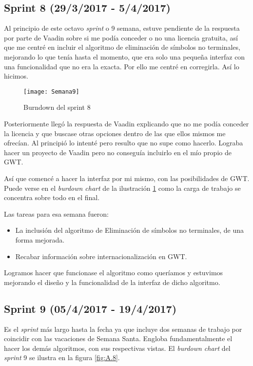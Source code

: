 \subsection{Sprint 8 (29/3/2017 - 5/4/2017)}

Al principio de este octavo \emph{sprint} o 9 semana, estuve pendiente de la respuesta por parte de Vaadin sobre si me podía conceder o no una licencia gratuita, así que me centré en incluir el algoritmo de eliminación de símbolos no terminales, mejorando lo que tenía hasta el momento, que era solo una pequeña interfaz con una funcionalidad que no era la exacta. Por ello me centré en corregirla. Así lo hicimos.

\begin{figure}[h]
\centering
\texttt{[image: Semana9]}
\caption{Burndown del sprint 8}
\label{fig:A.7}
\end{figure}

Posteriormente llegó la respuesta de Vaadin explicando que no me podía conceder la licencia y que buscase otras opciones dentro de las que ellos mismos me ofrecían. Al principió lo intenté pero resulto que no supe como hacerlo. Lograba hacer un proyecto de Vaadin pero no conseguía incluirlo en el mío propio de GWT.

Así que comencé a hacer la interfaz por mi mismo, con las posibilidades de GWT. Puede verse en el \emph{burdown chart }de la ilustración \ref{fig:A.7} como la carga de trabajo se concentra sobre todo en el final.

Las tareas para esa semana fueron: 

\begin{itemize}
\item La inclusión del algoritmo de Eliminación de símbolos no terminales, de una forma mejorada.
\item Recabar información sobre internacionalización en GWT.
\end{itemize}

Logramos hacer que funcionase el algoritmo como queríamos y estuvimos mejorando el diseño y la funcionalidad de la interfaz de dicho algoritmo.

\subsection{Sprint 9 (05/4/2017 - 19/4/2017)}

Es el \emph{sprint} más largo hasta la fecha ya que incluye dos semanas de trabajo por coincidir con las vacaciones de Semana Santa. Engloba fundamentalmente el hacer los demás algoritmos, con sus respectivas vistas. El \emph{burdown chart} del \emph{sprint} 9 se ilustra en la figura \ref{fig:A.8}.

